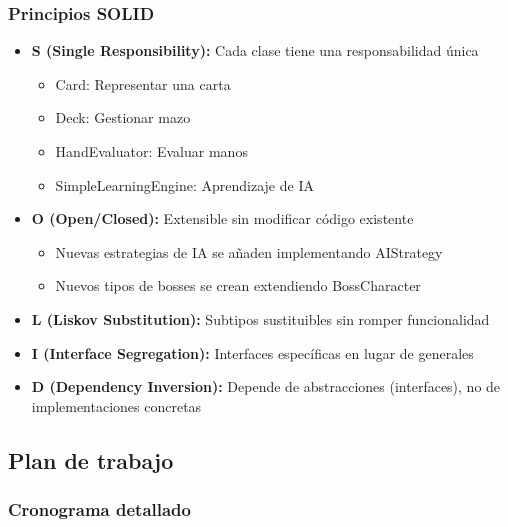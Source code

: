 \documentclass[12pt,a4paper]{article}
\begin{document}
\subsubsection{Principios SOLID}

\begin{itemize}
    \item \textbf{S (Single Responsibility):} Cada clase tiene una responsabilidad única
    \begin{itemize}
        \item Card: Representar una carta
        \item Deck: Gestionar mazo
        \item HandEvaluator: Evaluar manos
        \item SimpleLearningEngine: Aprendizaje de IA
    \end{itemize}
    
    \item \textbf{O (Open/Closed):} Extensible sin modificar código existente
    \begin{itemize}
        \item Nuevas estrategias de IA se añaden implementando AIStrategy
        \item Nuevos tipos de bosses se crean extendiendo BossCharacter
    \end{itemize}
    
    \item \textbf{L (Liskov Substitution):} Subtipos sustituibles sin romper funcionalidad
    
    \item \textbf{I (Interface Segregation):} Interfaces específicas en lugar de generales
    
    \item \textbf{D (Dependency Inversion):} Depende de abstracciones (interfaces), no de implementaciones concretas
\end{itemize}

\subsection{Plan de trabajo}

\subsubsection{Cronograma detallado}
\end{document}
